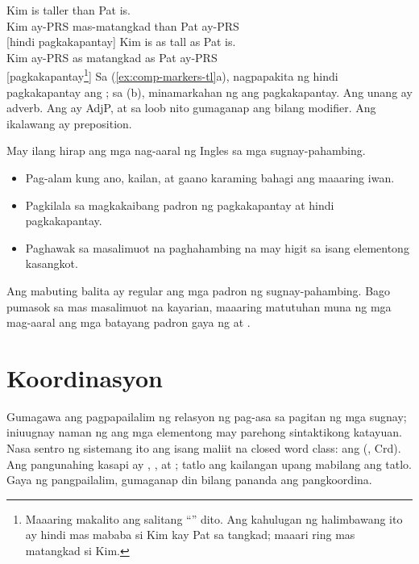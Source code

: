 \ea \label{ex:comp-markers-tl}
    \ea \gll Kim is taller than {\ob}Pat is{\cb}.\\
        Kim ay-PRS mas-matangkad than Pat ay-PRS\\
    \glt {} [hindi pagkakapantay]
    \ex \gll Kim is as tall as {\ob}Pat is{\cb}.\\
        Kim ay-PRS as matangkad as Pat ay-PRS\\
    \glt {} [pagkakapantay\footnote{Maaaring makalito ang salitang \enquote{} dito. Ang kahulugan ng halimbawang ito ay hindi mas mababa si Kim kay Pat sa tangkad; maaari ring mas matangkad si Kim.}]
    \z
\z
Sa (\ref{ex:comp-markers-tl}a), nagpapakita ng hindi pagkakapantay ang ; sa (b), minamarkahan ng  ang pagkakapantay. Ang unang  ay adverb. Ang  ay AdjP, at sa loob nito gumaganap ang  bilang modifier. Ang ikalawang  ay preposition.

May ilang hirap ang mga nag-aaral ng Ingles sa mga sugnay-pahambing.
\begin{itemize}[noitemsep]
    \item Pag-alam kung ano, kailan, at gaano karaming bahagi ang maaaring iwan.
    \item Pagkilala sa magkakaibang padron ng pagkakapantay at hindi pagkakapantay.
    \item Paghawak sa masalimuot na paghahambing na may higit sa isang elementong kasangkot.
\end{itemize}

Ang mabuting balita ay regular ang mga padron ng sugnay-pahambing. Bago pumasok sa mas masalimuot na kayarian, maaaring matutuhan muna ng mga mag-aaral ang mga batayang padron gaya ng   at  .

\section{Koordinasyon}\label{sec:coordination-tl}

Gumagawa ang pagpapailalim ng relasyon ng pag-asa sa pagitan ng mga sugnay; iniuugnay naman ng  ang mga elementong may parehong sintaktikong katayuan. Nasa sentro ng sistemang ito ang isang maliit na closed word class: ang  (, Crd). Ang pangunahing kasapi ay , , at ; tatlo ang kailangan upang mabilang ang tatlo. Gaya ng pangpailalim, gumaganap din bilang pananda ang pangkoordina.

